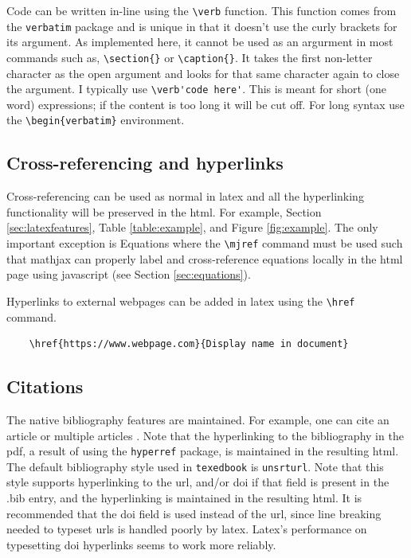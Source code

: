 \documentclass{article}
\begin{document}
Code can be written in-line using the \verb'\verb' function. This function comes from the \verb'verbatim' package and is unique in that it doesn't use the curly brackets for its argument. As implemented here, it cannot be used as an argurment in most commands such as, \verb'\section{}' or \verb'\caption{}'. It takes the first non-letter character as the open argument and looks for that same character again to close the argument. I typically use \verb_\verb'code here'_. This is meant for short (one word) expressions; if the content is too long it will be cut off. For long syntax use the \verb'\begin{verbatim}' environment.    

\subsection{Cross-referencing and hyperlinks}
Cross-referencing can be used as normal in latex and all the hyperlinking functionality will be preserved in the html. For example, Section \ref{sec:latexfeatures}, Table \ref{table:example}, and Figure \ref{fig:example}. The only important exception is Equations where the \verb'\mjref' command must be used such that mathjax can properly label and cross-reference equations locally in the html page using javascript (see Section \ref{sec:equations}).

Hyperlinks to external webpages can be added in latex using the \verb'\href' command.
\begin{verbatim}
    \href{https://www.webpage.com}{Display name in document}
\end{verbatim}

\subsection{Citations}
The native bibliography features are maintained. For example, one can cite an article \cite{Hanus2021} or multiple articles \cite{Hanus2019,Hanus2021,Gregory2021}. Note that the hyperlinking to the bibliography in the pdf, a result of using the \verb'hyperref' package, is maintained in the resulting html. The default bibliography style used in \verb'texedbook' is \verb'unsrturl'. Note that this style supports hyperlinking to the url, and/or doi if that field is present in the .bib entry, and the hyperlinking is maintained in the resulting html. It is recommended that the doi field is used instead of the url, since line breaking needed to typeset urls is handled poorly by latex. Latex's performance on typesetting doi hyperlinks seems to work more reliably.
\end{document}
